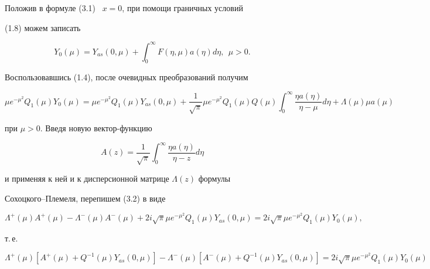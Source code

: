  


\begin{pf} 


Положив в формуле (3.1) \ $x=0$, при помощи граничных условий 


(1.8) можем записать 


$$ 


Y_0(\mu)=Y_{as}(0,\mu)+\int^\infty_0 F(\eta,\mu)a(\eta)d\eta, 


\ \ \mu>0. 


$$ 


Воспользовавшись (1.4), после очевидных преобразований получим 


\begin{equation} 


\mu e^{-\mu^2}Q_1(\mu)Y_0(\mu)=\mu e^{-\mu^2}Q_1(\mu)Y_{as}(0,\mu)+ 


\frac{1}{\sqrt{\pi}}\mu e^{-\mu^2}Q_1(\mu)Q(\mu)\int^\infty_0 


\frac{\eta a(\eta)}{\eta-\mu}d\eta+\Lambda(\mu) 


\mu a(\mu) 


\end{equation} 


при $\mu>0$. Введя новую вектор-функцию 


\begin{equation} 


A(z)=\frac{1}{\sqrt{\pi}}\int^\infty_0 


\frac{\eta a(\eta)}{\eta-z}d\eta 


\end{equation} 


и применяя к ней и к дисперсионной матрице $\Lambda(z)$ формулы 


Сохоцкого--Племеля, перепишем (3.2) в виде 


$$ 


\Lambda^+(\mu)A^+(\mu)-\Lambda^-(\mu)A^-(\mu)+2i\sqrt{\pi} 


\mu e^{-\mu^2}Q_1(\mu)Y_{as}(0,\mu)=2i\sqrt{\pi}\mu 


e^{-\mu^2}Q_1(\mu)Y_0(\mu), 


$$ 


т.\,е. 


$$ 


\Lambda^+(\mu)[A^+(\mu)+Q^{-1}(\mu)Y_{as}(0,\mu)]- 


\Lambda^-(\mu)[A^-(\mu)+Q^{-1}(\mu)Y_{as}(0,\mu)]=2i 


\sqrt{\pi}\mu e^{-\mu^2}Q_1(\mu)Y_0(\mu)


$$ 



\end{pf}
